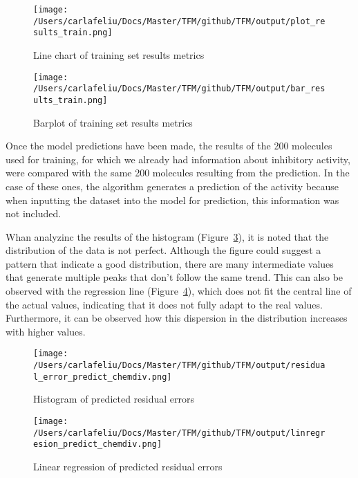 \documentclass[final,times,twocolumn,article]{elsarticle}
\begin{document}
 \begin{figure}[ht]
     \centering 
      \texttt{[image: /Users/carlafeliu/Docs/Master/TFM/github/TFM/output/plot\_results\_train.png]}	
      \caption{Line chart of training set results metrics} 
      \label{Figure2}
  \end{figure}
 
  \begin{figure}[ht]
     \centering 
      \texttt{[image: /Users/carlafeliu/Docs/Master/TFM/github/TFM/output/bar\_results\_train.png]}	
      \caption{Barplot of training set results metrics} 
      \label{Figure3}
  \end{figure}

Once the model predictions have been made, the results of the 200 molecules used for training, for which we already had information about inhibitory activity, were compared with the same 200 molecules resulting from the prediction. In the case of these ones, the algorithm generates a prediction of the activity because when inputting the dataset into the model for prediction, this information was not included. 

Whan analyzinc the results of the histogram (Figure~\ref{Figure4}), it is noted that the distribution of the data is not perfect. Although the figure could suggest a pattern that indicate a good distribution, there are many intermediate values that generate multiple peaks that don't follow the same trend. This can also be observed with the regression line (Figure~\ref{Figure5}), which does not fit the central line of the actual values, indicating that it does not fully adapt to the real values. Furthermore, it can be observed how this dispersion in the distribution increases with higher values. 

\begin{figure}[ht]
    \centering 
     \texttt{[image: /Users/carlafeliu/Docs/Master/TFM/github/TFM/output/residual\_error\_predict\_chemdiv.png]}	
     \caption{Histogram of predicted residual errors} 
     \label{Figure4}
 \end{figure}

 \begin{figure}[ht]
    \centering 
     \texttt{[image: /Users/carlafeliu/Docs/Master/TFM/github/TFM/output/linregresion\_predict\_chemdiv.png]}	
     \caption{Linear regression of predicted residual errors} 
     \label{Figure5}
 \end{figure}
\end{document}
